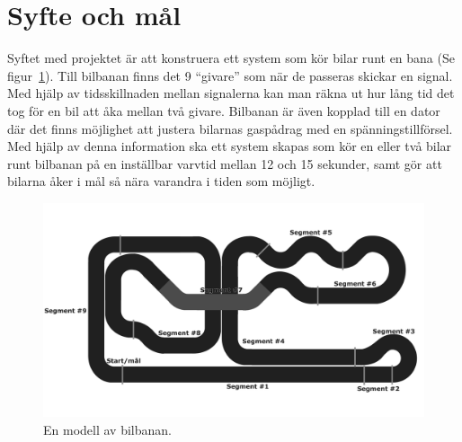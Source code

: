 \section{Syfte och mål}

Syftet med projektet är att konstruera ett system som kör bilar runt en
bana (Se figur~\ref{fig:track_modell}). Till bilbanan finns det 9 ``givare'' som när de passeras skickar en
signal. Med hjälp av tidsskillnaden mellan signalerna kan man räkna ut hur lång
tid det tog för en bil att åka mellan två givare. Bilbanan är även kopplad till
en dator där det finns möjlighet att justera bilarnas gaspådrag med en
spänningstillförsel. Med hjälp av denna information ska ett system skapas som
kör en eller två bilar runt bilbanan på en inställbar varvtid mellan 12 och 15
sekunder, samt gör att bilarna åker i mål så nära varandra i tiden som möjligt.

\begin{figure}
  \centering
  \includegraphics[width=\linewidth]{figures/BanaModell.pdf}
  \caption{En modell av bilbanan.}%
  \label{fig:track_modell}
\end{figure}

